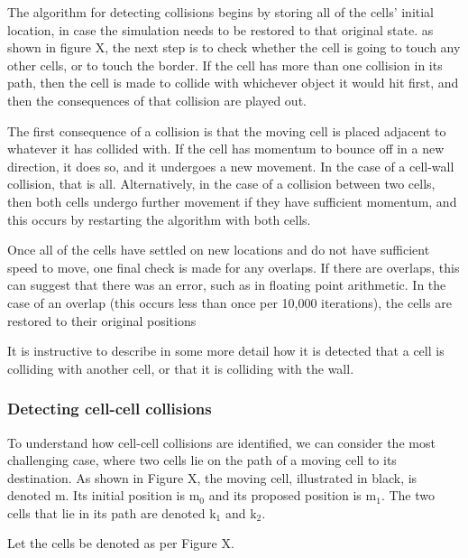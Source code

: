 \documentclass[11.5pt]{article}
\begin{document}
The algorithm for detecting collisions begins by storing all of the 
cells' initial location, in case the simulation needs to be restored to 
that original state. as shown in figure X, the next step is to check 
whether the cell is going to touch any other cells, or to touch the 
border. If the cell has more than one collision in its path, then the 
cell is made to collide with whichever object it would hit first, and 
then the consequences of that collision are played out. 



The first consequence of a collision is that the moving cell is placed 
adjacent to whatever it has collided with. If the cell has momentum to 
bounce off in a new direction, it does so, and it undergoes a new 
movement. In the case of a cell-wall collision, that is all. 
Alternatively, in the case of a collision between two cells, then both 
cells undergo further movement if they have sufficient momentum, and 
this occurs by restarting the algorithm with both cells.



Once all of the cells have settled on new locations and do not have 
sufficient speed to move, one final check is made for any overlaps. If 
there are overlaps, this can suggest that there was an error, such as in 
floating point arithmetic. In the case of an overlap (this occurs less 
than once per 10,000 iterations), the cells are restored to their 
original positions



It is instructive to describe in some more detail how it is detected 
that a cell is colliding with another cell, or that it is colliding with 
the wall.



\subsubsection{Detecting cell-cell 
collisions}
To understand how cell-cell collisions are identified, we can consider 
the most challenging case, where two cells lie on the path of a moving 
cell to its destination. As shown in Figure X, the moving cell, 
illustrated in black, is denoted m. Its initial position is m$_{0}$ 
and its proposed position is m$_{1}$. The two cells that lie in its 
path are denoted k$_{1}$ and k$_{2}$.



Let the cells be denoted as per Figure X.

\begin{figure}[H]
\centering
\end{figure}
\end{document}
